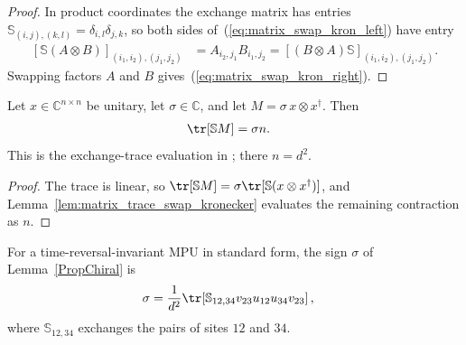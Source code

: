 \begin{proof}\leanok
    In product coordinates the exchange matrix has entries
    $\mathbb S_{(i,j),(k,l)}=\delta_{i,l}\delta_{j,k}$, so both sides of~(\ref{eq:matrix_swap_kron_left}) have entry
    \begin{align}
        \left[\mathbb S(A\otimes B)\right]_{(i_1,i_2),(j_1,j_2)}
         & =A_{i_2,j_1}B_{i_1,j_2}
        =\left[(B\otimes A)\mathbb S\right]_{(i_1,i_2),(j_1,j_2)}.
    \end{align}
    Swapping factors $A$ and $B$ gives~(\ref{eq:matrix_swap_kron_right}).
\end{proof}

\begin{lemma}
    \label{thm:matrix_trace_swap_scaled_kronecker}
    \leanok
    Let $x\in\mathbb C^{n\times n}$ be unitary, let $\sigma\in\mathbb C$, and let
    $M=\sigma\,x\otimes x^\dagger$. Then
    \begin{align}
        \tr\!\left[\mathbb SM\right] & =\sigma n.
    \end{align}
    This is the exchange-trace evaluation in
    \cite[lines~1608--1610]{Cirac2017MPU}; there $n=d^2$.
\end{lemma}

\begin{proof}\leanok
    The trace is linear, so
    $\tr[\mathbb SM]=\sigma\tr[\mathbb S(x\otimes x^\dagger)]$, and
    Lemma~\ref{lem:matrix_trace_swap_kronecker} evaluates the remaining
    contraction as $n$.
\end{proof}

\begin{lemma}
    \label{eq:sigma-from-trace}
    \leanok
    For a time-reversal-invariant MPU in standard form, the sign $\sigma$ of
    Lemma~\ref{PropChiral} is
    \begin{align}
        \sigma & =\frac1{d^2}\tr\!\left[\mathbb S_{12,34}
            v_{23}u_{12}u_{34}v_{23}\right],
    \end{align}
    where $\mathbb S_{12,34}$ exchanges the pairs of sites $12$ and $34$.
\end{lemma}

